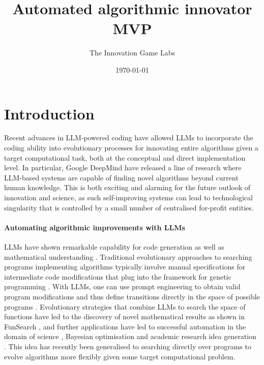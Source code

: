 \documentclass[12pt, legalpaper]{article}
\title{Automated algorithmic innovator MVP}
\author{The Innovation Game Labs}
\date{\monthyeardate\today}
\begin{document}
\maketitle





\section{Introduction}

Recent advances in LLM-powered coding have allowed LLMs to incorporate the coding ability into evolutionary processes for innovating entire algorithms given a target computational task, both at the conceptual and direct implementation level. 
In particular, Google DeepMind have released a line of research \citep{romera2024mathematical, novikov2025alphaevolve} where LLM-based systems are capable of finding novel algorithms beyond current human knowledge. 
This is both exciting and alarming for the future outlook of innovation and science, as such self-improving systems can lead to technological singularity that is controlled by a small number of centralised for-profit entities. 


\paragraph{Automating algorithmic improvements with LLMs}

LLMs have shown remarkable capability for code generation \citep{wang2023review, liu2023your} as well as mathematical understanding \citep{holt2024data, merler2024context}. 
Traditional evolutionary approaches to searching programs implementing algorithms typically involve manual specifications for intermediate code modifications that plug into the framework for genetic programming \citep{koza1994genetic, banzhaf1998genetic}. 
With LLMs, one can use prompt engineering to obtain valid program modifications and thus define transitions directly in the space of possible programs \citep{morris2024llm}. 
Evolutionary strategies that combine LLMs to search the space of functions have led to the discovery of novel mathematical results as shown in FunSearch \citep{romera2024mathematical, ellenberg2025generative}, and further applications have led to successful automation in the domain of science \citep{lu2024ai}, Bayesian optimisation \citep{aglietti2024funbo} and academic research idea generation \citep{li2024chain}. 
This idea has recently been generalised to searching directly over programs \citep{novikov2025alphaevolve} to evolve algorithms more flexibly given some target computational problem. 
\end{document}

